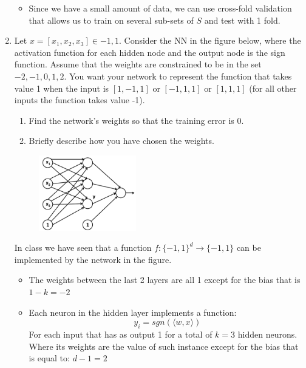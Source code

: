 \documentclass[a4paper,11pt,oneside]{book}
\begin{document}
\begin{enumerate}
\begin{solution}
\begin{itemize}
            \item Since we have a small amount of data, we can use cross-fold validation that allows us to train on several sub-sets of $S$ and test with 1 fold.
            \end{itemize}
        \end{solution}
        \clearpage
        \item Let $x = [x_1, x_2, x_3] \in {-1, 1}$. Consider the NN in the figure below, where the activation function for each hidden node and the output node is the sign function. Assume that the weights are constrained to be in the set ${-2, -1, 0, 1, 2}$. You want your network to represent the function that takes value 1 when the input is $[1, -1, 1]$ or $[-1, 1, 1]$ or $[1, 1, 1]$ (for all other inputs the function takes value -1).
        \begin{enumerate}
            \item Find the network's weights so that the training error is 0.
            \item Briefly describe how you have chosen the weights.
        \end{enumerate}
        \begin{figure}[H]
            \centering
            \includegraphics[width=0.4\textwidth,height=0.6\textheight,keepaspectratio]{images/graph_3_1_Feb_2022.png}
        \end{figure}
        \begin{solution}
            In class we have seen that a function $f:\{-1,1\}^d \to \{-1,1\}$ can be implemented by the network in the figure.
            
            \begin{itemize}
            \item The weights between the last 2 layers are all 1 except for the bias that is $1-k = -2$
            
            \item Each neuron in the hidden layer implements a function:
            $$y_i = sgn(\langle w,x \rangle)$$
            For each input that has as output 1 for a total of $k=3$ hidden neurons.
            Where its weights are the value of such instance except for the bias that is equal to: $d-1 = 2$
    

\end{itemize}
\end{solution}
\end{enumerate}
\end{document}
